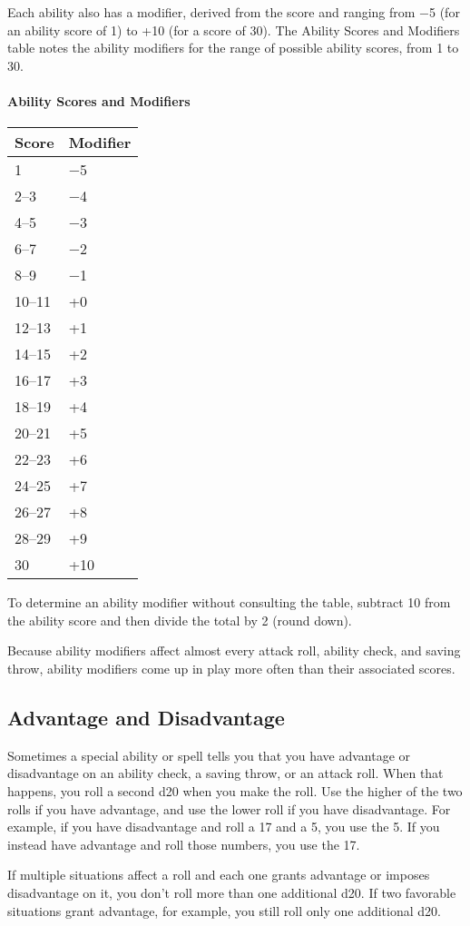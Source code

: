 \documentclass[
]{article}
\begin{document}
Each ability also has a modifier, derived from the score and ranging
from −5 (for an ability score of 1) to +10 (for a score of 30). The
Ability Scores and Modifiers table notes the ability modifiers for the
range of possible ability scores, from 1 to 30.

\hypertarget{ability-scores-and-modifiers-1}{%
\paragraph{Ability Scores and
Modifiers}\label{ability-scores-and-modifiers-1}}

\begin{longtable}[]{@{}ll@{}}
\toprule
Score & Modifier\tabularnewline
\midrule
\endhead
1 & −5\tabularnewline
2--3 & −4\tabularnewline
4--5 & −3\tabularnewline
6--7 & −2\tabularnewline
8--9 & −1\tabularnewline
10--11 & +0\tabularnewline
12--13 & +1\tabularnewline
14--15 & +2\tabularnewline
16--17 & +3\tabularnewline
18--19 & +4\tabularnewline
20--21 & +5\tabularnewline
22--23 & +6\tabularnewline
24--25 & +7\tabularnewline
26--27 & +8\tabularnewline
28--29 & +9\tabularnewline
30 & +10\tabularnewline
\bottomrule
\end{longtable}

To determine an ability modifier without consulting the table, subtract
10 from the ability score and then divide the total by 2 (round down).

Because ability modifiers affect almost every attack roll, ability
check, and saving throw, ability modifiers come up in play more often
than their associated scores.

\hypertarget{advantage-and-disadvantage}{%
\subsection{Advantage and
Disadvantage}\label{advantage-and-disadvantage}}

Sometimes a special ability or spell tells you that you have advantage
or disadvantage on an ability check, a saving throw, or an attack roll.
When that happens, you roll a second d20 when you make the roll. Use the
higher of the two rolls if you have advantage, and use the lower roll if
you have disadvantage. For example, if you have disadvantage and roll a
17 and a 5, you use the 5. If you instead have advantage and roll those
numbers, you use the 17.

If multiple situations affect a roll and each one grants advantage or
imposes disadvantage on it, you don't roll more than one additional d20.
If two favorable situations grant advantage, for example, you still roll
only one additional d20.
\end{document}
